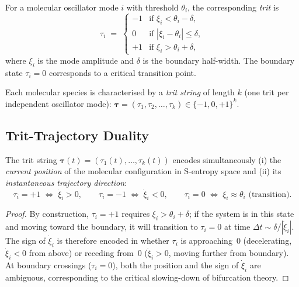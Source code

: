 \begin{definition}
\label{def:ch03-trit}
For a molecular oscillator mode $i$ with threshold $\theta_i$, the
corresponding \emph{trit} is
\begin{equation}
    \tau_i \;=\;
    \begin{cases}
        -1 & \text{if } \xi_i < \theta_i - \delta, \\
         0 & \text{if } |\xi_i - \theta_i| \leq \delta, \\
        +1 & \text{if } \xi_i > \theta_i + \delta,
    \end{cases}
    \label{eq:ch03-trit-def}
\end{equation}
where $\xi_i$ is the mode amplitude and $\delta$ is the boundary half-width.
The boundary state $\tau_i=0$ corresponds to a critical transition point.
\end{definition}

Each molecular species is characterised by a \emph{trit string} of length
$k$ (one trit per independent oscillator mode):
$\boldsymbol{\tau}=(\tau_1,\tau_2,\ldots,\tau_k)\in\{-1,0,+1\}^k$.

\subsection{Trit-Trajectory Duality}

\begin{theorem}
\label{thm:ch03-trit-trajectory}
The trit string $\boldsymbol{\tau}(t)=(\tau_1(t),\ldots,\tau_k(t))$ encodes
simultaneously (i) the \emph{current position} of the molecular configuration
in S-entropy space and (ii) its \emph{instantaneous trajectory direction}:
\begin{equation}
    \tau_i = +1 \;\Leftrightarrow\; \dot{\xi}_i > 0,
    \qquad
    \tau_i = -1 \;\Leftrightarrow\; \dot{\xi}_i < 0,
    \qquad
    \tau_i = 0 \;\Leftrightarrow\; \xi_i \approx\theta_i
    \text{ (transition).}
    \label{eq:ch03-trit-trajectory}
\end{equation}
\end{theorem}

\begin{proof}
By construction, $\tau_i=+1$ requires $\xi_i>\theta_i+\delta$; if the system
is in this state and moving toward the boundary, it will transition to
$\tau_i=0$ at time $\Delta t\sim\delta/|\dot{\xi}_i|$.  The sign of
$\dot{\xi}_i$ is therefore encoded in whether $\tau_i$ is
approaching~0 (decelerating, $\dot{\xi}_i<0$ from above) or receding from~0
($\dot{\xi}_i>0$, moving further from boundary).  At boundary crossings
($\tau_i=0$), both the position and the sign of $\dot{\xi}_i$ are ambiguous,
corresponding to the critical slowing-down of bifurcation theory.
\end{proof}

